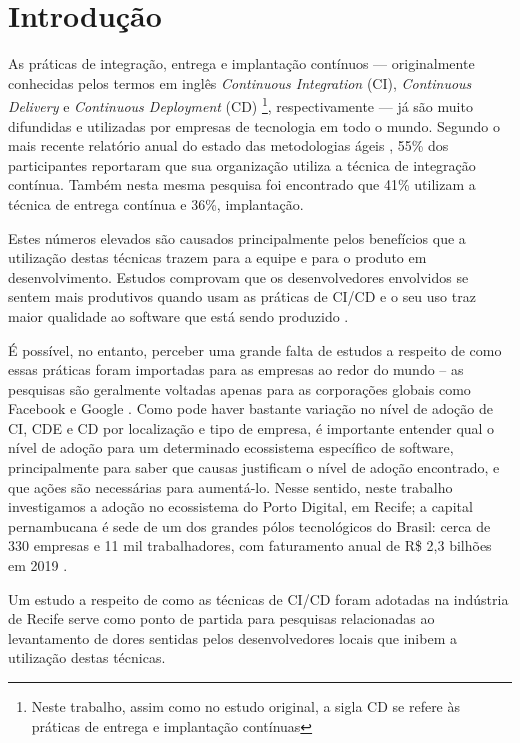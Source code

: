 
\section{Introdução}

As práticas de integração, entrega e implantação contínuos \cite{fowlerCI, fowlerCD} --- originalmente conhecidas pelos termos em inglês \emph{Continuous Integration} (CI), \emph{Continuous Delivery} e \emph{Continuous Deployment} (CD) \footnote{Neste trabalho, assim como no estudo original, a sigla CD se refere às práticas de entrega e implantação contínuas}, respectivamente --- já são muito difundidas e utilizadas por empresas de tecnologia em todo o mundo. Segundo o mais recente relatório anual do estado das metodologias ágeis \cite{stateAgileReport2020}, 55\% dos participantes reportaram que sua organização utiliza a técnica de integração contínua. Também nesta mesma pesquisa foi encontrado que 41\% utilizam a técnica de entrega contínua e 36\%, implantação.

Estes números elevados são causados principalmente pelos benefícios que a utilização destas técnicas trazem para a equipe e para o produto em desenvolvimento. Estudos comprovam que os desenvolvedores envolvidos se sentem mais produtivos quando usam as práticas de CI/CD \cite{hilton2016} e o seu uso traz maior qualidade ao software que está sendo produzido \cite{savor2015}. 

É possível, no entanto, perceber uma grande falta de estudos a respeito de como essas práticas foram importadas para as empresas ao redor do mundo \cite{empiricalStudy2016} -- as pesquisas são geralmente voltadas apenas para as corporações globais como Facebook \cite{savor2015} e Google \cite{googleCi}. Como pode haver bastante variação no nível de adoção de CI, CDE e CD por localização e tipo de empresa, é importante entender qual o nível de adoção para um determinado ecossistema específico de software, principalmente para saber que causas justificam o nível de adoção encontrado, e que ações são necessárias para aumentá-lo. Nesse sentido, neste trabalho investigamos  a adoção no ecossistema do Porto Digital, em Recife; a capital pernambucana é sede de um dos grandes pólos tecnológicos do Brasil: cerca de 330 empresas e 11 mil trabalhadores, com faturamento anual de R\$ 2,3 bilhões em 2019 \cite{portoDigital}.

Um estudo a respeito de como as técnicas de CI/CD foram adotadas na indústria de Recife serve como ponto de partida para pesquisas relacionadas ao levantamento de dores sentidas pelos desenvolvedores locais que inibem a utilização destas técnicas.

